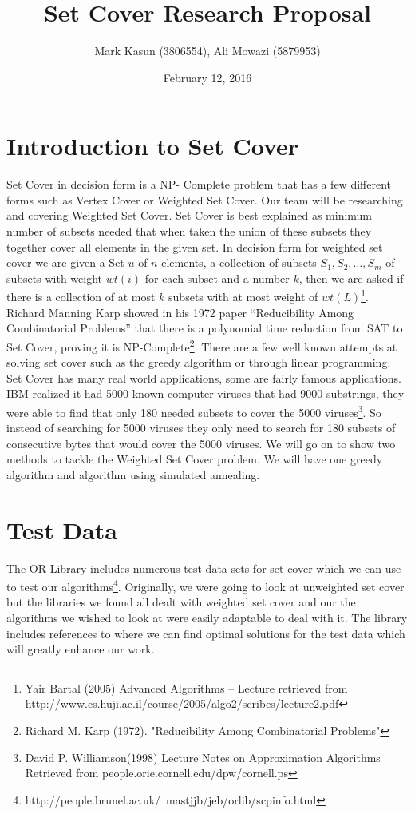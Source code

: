 \documentclass[12pt]{report}
\title{Set Cover Research Proposal}
\author{Mark Kasun (3806554), Ali Mowazi (5879953)}
\date{February 12, 2016}
\begin{document}
\maketitle

\section{Introduction to Set Cover}

Set Cover in decision form is a NP- Complete problem that has a few different forms such as 
Vertex Cover or Weighted Set Cover. Our team will be researching and covering Weighted Set Cover. Set Cover is best explained as minimum number of subsets needed that when taken the union of these subsets they together cover all elements in the given set. In decision form for weighted set cover we are given a Set $u$ of $n$ elements, a collection of subsets $S_1,S_2,\ldots,S_m$ of subsets with weight $wt(i)$ for each subset and a number $k$, then we are asked if there is a collection of at most $k$ subsets with at most weight of $wt(L)$\footnote{Yair Bartal (2005) Advanced Algorithms – Lecture retrieved from http://www.cs.huji.ac.il/course/2005/algo2/scribes/lecture2.pdf}. Richard Manning Karp showed in his 1972 paper “Reducibility Among Combinatorial Problems” that there is a polynomial time reduction from SAT to Set Cover, proving it is NP-Complete\footnote{Richard M. Karp (1972). "Reducibility Among Combinatorial Problems"}. There are a few well known attempts at solving set cover such as the greedy algorithm or through linear programming. Set Cover has many real world applications, some are fairly famous applications. IBM realized it had 5000 known computer viruses that had 9000 substrings, they were able to find that only 180 needed subsets to cover the 5000 viruses\footnote{David P. Williamson(1998) Lecture Notes on Approximation Algorithms Retrieved from people.orie.cornell.edu/dpw/cornell.ps}. So instead of searching for 5000 viruses they only need to search for 180 subsets of consecutive bytes that would cover the 5000 viruses. We will go on to show two methods to tackle the Weighted Set Cover problem. We will have one greedy algorithm and algorithm using simulated annealing.

\section{Test Data}
The OR-Library includes numerous test data sets for set cover which we can use to test our algorithms\footnote{http://people.brunel.ac.uk/~mastjjb/jeb/orlib/scpinfo.html}. Originally, we were going to look at unweighted set cover but the libraries we found all dealt with weighted set cover and our the algorithms we wished to look at were easily adaptable to deal with it. The library includes references to where we can find optimal solutions for the test data which will greatly enhance our work.
\end{document}
